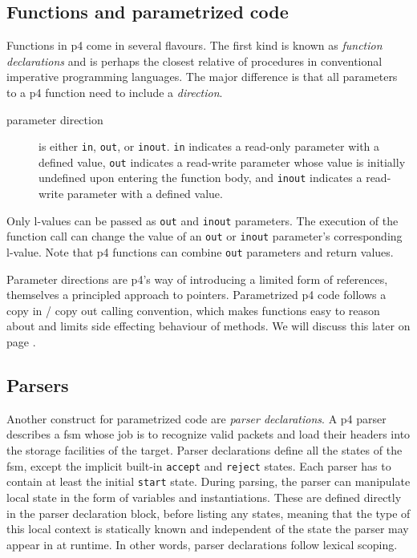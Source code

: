 \subsection*{Functions and parametrized code}

Functions in \acrshort{p4} come in several flavours. The first kind is known as
\emph{function declarations} and is perhaps the closest relative of procedures
in conventional imperative programming languages. The major difference is that
all parameters to a \acrshort{p4} function need to include a \emph{direction}.

\begin{description}
	\item[parameter direction] is either \texttt{in}, \texttt{out}, or
	\texttt{inout}. \texttt{in} indicates a read-only parameter with a defined
	value, \texttt{out} indicates a read-write parameter whose value is
	initially undefined upon entering the function body, and \texttt{inout}
	indicates a read-write parameter with a defined value.
\end{description}

Only l-values can be passed as \texttt{out} and \texttt{inout} parameters. The
execution of the function call can change the value of an \texttt{out} or
\texttt{inout} parameter's corresponding l-value. Note that \acrshort{p4}
functions can combine \texttt{out} parameters and return values.

Parameter directions are \acrshort{p4}'s way of introducing a limited form of
references, themselves a principled approach to pointers. Parametrized
\acrshort{p4} code follows a copy in / copy out calling convention, which makes
functions easy to reason about and limits side effecting behaviour of \extern{}
methods. We will discuss this later on page \pageref{sec:p4-calling-convention}.

\subsection*{Parsers}

Another construct for parametrized code are \emph{parser declarations}. A
\acrshort{p4} parser describes a \acrlong{fsm} whose job is to recognize valid
packets and load their headers into the storage facilities of the target. Parser
declarations define all the states of the \acrshort{fsm}, except the implicit
built-in \texttt{accept} and \texttt{reject} states. Each parser has to contain
at least the initial \texttt{start} state. During parsing, the parser can
manipulate local state in the form of variables and \extern{} instantiations.
These are defined directly in the parser declaration block, before listing any
states, meaning that the type of this local context is statically known and
independent of the state the parser may appear in at runtime. In other words,
parser declarations follow lexical scoping.

